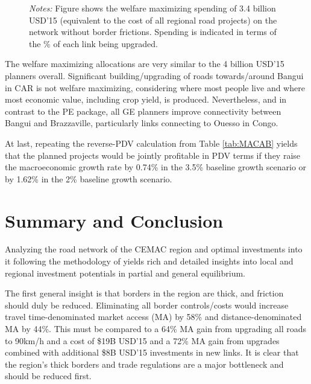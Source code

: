 \documentclass[a4paper]{article}
\begin{document}
\begin{figure}[H]
{\begin{tabular}{@{}c@{}c@{}c@{}}
\end{tabular}
}
\scriptsize 
\emph{Notes:} Figure shows the welfare maximizing spending of 3.4 billion USD'15 (equivalent to the cost of all regional road projects) on the network without border frictions. Spending is indicated in terms of the \% of each link being upgraded. 
 \vspace{-1mm}
\end{figure}

The welfare maximizing allocations are very similar to the 4 billion USD'15 planners overall. Significant building/upgrading of roads towards/around Bangui in CAR is not welfare maximizing, considering where most people live and where most economic value, including crop yield, is produced. Nevertheless, and in contrast to the PE package, all GE planners improve connectivity between Bangui and Brazzaville, particularly links connecting to Ouesso in Congo. \newline 


At last, repeating the reverse-PDV calculation from Table \ref{tab:MACAB} yields that the planned projects would be jointly profitable in PDV terms if they raise the macroeconomic growth rate by 0.74\% in the 3.5\% baseline growth scenario or by 1.62\% in the 2\% baseline growth scenario. \newline 




\section{Summary and Conclusion} 

Analyzing the road network of the CEMAC region and optimal investments into it following the methodology of \citet{krantz2024optimal} yields rich and detailed insights into local and regional investment potentials in partial and general equilibrium. \newline 

The first general insight is that borders in the region are thick, and friction should duly be reduced. Eliminating all border controls/costs would increase travel time-denominated market access (MA) by 58\% and distance-denominated MA by 44\%. This must be compared to a 64\% MA gain from upgrading all roads to 90km/h and a cost of \$19B USD'15 and a 72\% MA gain from upgrades combined with additional \$8B USD'15 investments in new links. It is clear that the region's thick borders and trade regulations are a major bottleneck and should be reduced first. \newline 
\end{document}
